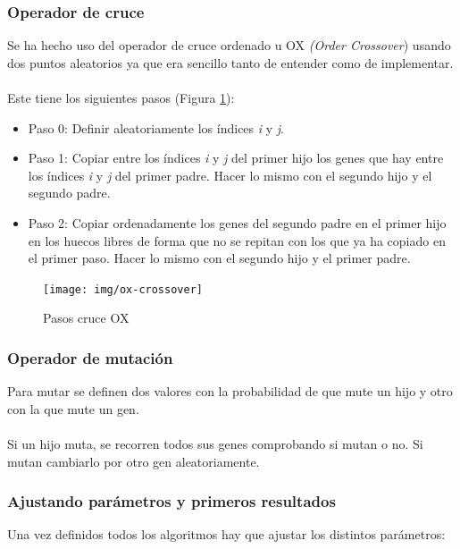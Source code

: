 \label{sec:op-cruce}
\subsubsection{Operador de cruce}

Se ha hecho uso del operador de cruce ordenado u OX \textit{(Order Crossover}) \cite{Davis:1985:AAA:1625135.1625164} usando dos puntos aleatorios ya que era sencillo tanto de entender como de implementar.
\\ \\
Este tiene los siguientes pasos (Figura \ref{fig:ox-crossover}):

\begin{itemize}
	\item Paso 0: Definir aleatoriamente los índices \textit{i} y \textit{j}.
	\item Paso 1: Copiar entre los índices \textit{i} y \textit{j} del primer hijo los genes que hay entre los índices \textit{i} y \textit{\textit{j}} del primer padre. Hacer lo mismo con el segundo hijo y el segundo padre.
	\item Paso 2: Copiar ordenadamente los genes del segundo padre en el primer hijo en los huecos libres de forma que no se repitan con los que ya ha copiado en el primer paso. Hacer lo mismo con el segundo hijo y el primer padre.
\end{itemize}

\begin{figure}[H]
	\centering
	\texttt{[image: img/ox-crossover]}
	\caption{Pasos cruce OX}
	\label{fig:ox-crossover}
\end{figure}

\subsubsection{Operador de mutación}

Para mutar se definen dos valores con la probabilidad de que mute un hijo y otro con la que mute un gen.
\\ \\
Si un hijo muta, se recorren todos sus genes comprobando si mutan o no. Si mutan cambiarlo por otro gen aleatoriamente.

\label{sec:standard-parameters}
\subsubsection{Ajustando parámetros y primeros resultados}

Una vez definidos todos los algoritmos hay que ajustar los distintos parámetros:

